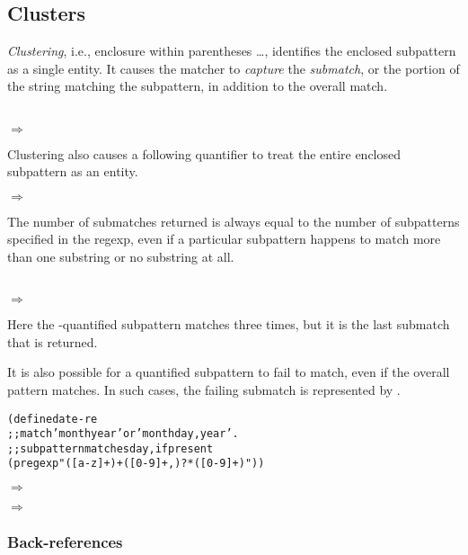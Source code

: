 \subsection {Clusters}

\emph{Clustering}, i.e., enclosure within parentheses
\code{(}\ldots\code{)}, identifies the enclosed subpattern as a single
entity.  It causes the matcher to \emph{capture} the \emph{submatch},
or the portion of the string matching the subpattern, in addition to
the overall match.

 \\
$\Rightarrow$ 

Clustering also causes a following quantifier to treat the entire
enclosed subpattern as an entity.

 $\Rightarrow$

The number of submatches returned is always equal to the number of
subpatterns specified in the regexp, even if a particular subpattern
happens to match more than one substring or no substring at all.

 \\
$\Rightarrow$ 

Here the \code{*}-quantified subpattern matches three times, but it is
the last submatch that is returned.

It is also possible for a quantified subpattern to fail to match, even
if the overall pattern matches.  In such cases, the failing submatch
is represented by .

\begin{alltt}
(define date-re
  ;; match 'month year' or 'month day, year'.
  ;; subpattern matches day, if present
  (pregexp "([a-z]+) +([0-9]+,)? *([0-9]+)"))
\end{alltt}

 $\Rightarrow$

 $\Rightarrow$

\subsubsection {Back-references}\label{sec:pregexp-back-references}

